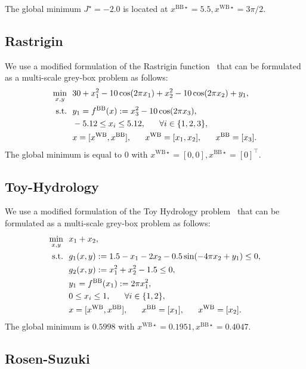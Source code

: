 \documentclass[12pt,a4paper]{article}%
\theoremstyle{plain}%
\theoremstyle{remark}%
\theoremstyle{definition}%
\def\WB{\mathrm{WB}}
\def\BB{\mathrm{BB}}
\begin{document}
\begin{appendices}
The global minimum $J^\star = -2.0$ is located at $x^{\BB\star}=5.5, x^{\WB\star}=3\pi/2$.

\subsection{Rastrigin}\label{subsec:app_rastrigin}

We use a modified formulation of the Rastrigin function~\cite{rastrigin1974} that can be formulated as a multi-scale grey-box problem as follows:
\begin{align} \label{eq:Rastrigin}
    \min_{x, y} &~~ 30 + x_1^2 - 10\cos(2\pi x_1) + x_2^2 - 10\cos(2\pi x_2) + y_1, \\\notag
    \text{s.t.} &~~ y_1 = f^\BB(x) := x_3^2 - 10\cos( 2 \pi x_3), \\\notag
    &~~ -5.12 \leq x_i \leq 5.12, ~~~~~ \forall i \in \{ 1, 2,3 \}, \\\notag
    &~~ x = [x^{\WB}, x^{\BB}], ~~~~~ x^{\WB} = [x_1, x_2], ~~~~~ x^{\BB} = [x_3].
\end{align}
The global minimum is equal to $0$ with $x^{\WB\star} = [0, 0], x^{\BB\star} = [0]^\top$.

\subsection{Toy-Hydrology}\label{subsec:app_hydrology}

We use a modified formulation of the Toy Hydrology problem~\cite{gramacy2016} that can be formulated as a multi-scale grey-box problem as follows:
\begin{align} \label{eq:ToyHydrology}
    \min_{x, y} &~~ x_1 + x_2, \\\notag
    \text{s.t.} &~~ g_1(x, y) := 1.5 - x_1 - 2x_2 - 0.5\sin(-4\pi x_2 + y_1) \leq 0, \\\notag
    &~~ g_2(x, y) := x_1^2 + x_2^2 - 1.5 \leq 0, \\\notag
    &~~ y_1 = f^\BB(x_1) := 2 \pi x_1^2, \\\notag
    &~~ 0 \leq x_i \leq 1, ~~~~~ \forall i \in \{ 1, 2 \}, \\\notag
    &~~ x = [x^{\WB}, x^{\BB}], ~~~~~ x^{\BB} = [x_1], ~~~~~ x^{\WB} = [x_2].
\end{align}
The global minimum is $0.5998$ with $x^{\WB\star} = 0.1951, x^{\BB\star} = 0.4047$.

\subsection{Rosen-Suzuki}\label{subsec:app_rosen_suzuki}


\end{appendices}
\end{document}

